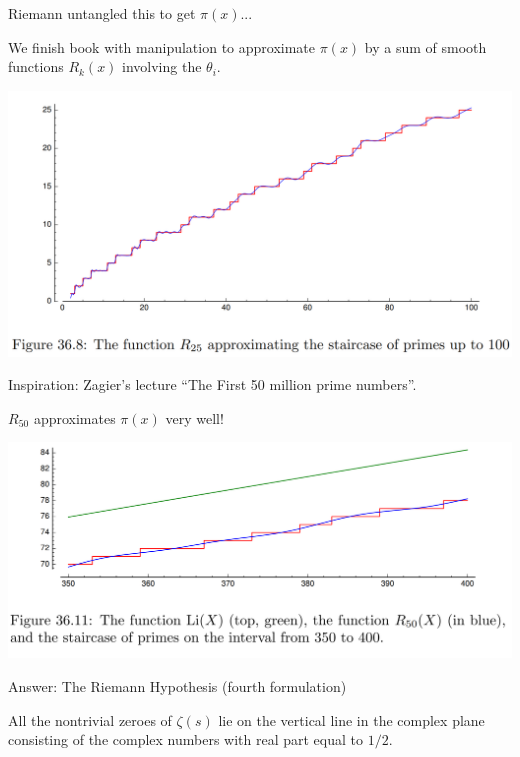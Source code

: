 \documentclass{beamer}
\begin{document}
\begin{frame}{Riemann untangled this to get $\pi(x)$...}

  We finish book with manipulation to approximate $\pi(x)$
  by a sum of smooth functions $R_k(x)$ involving the $\theta_i$.
  \vfill

  \includegraphics[height=.65\textheight]{pics/R25-approx}

  \vfill
  Inspiration: Zagier's lecture ``The First 50 million prime numbers''.
\end{frame}


\begin{frame}{$R_{50}$ approximates $\pi(x)$ very well!}

  \includegraphics[height=.55\textheight]{pics/Li-R50-pi}

\end{frame}



\begin{frame}{Answer: The Riemann Hypothesis (fourth formulation)}
  \begin{block}{}
    All the nontrivial zeroes of $\zeta(s)$ lie on the vertical
    line in the complex plane consisting of the
    complex numbers with real part equal to $1/2$.
  \end{block}
\end{frame}
\end{document}
